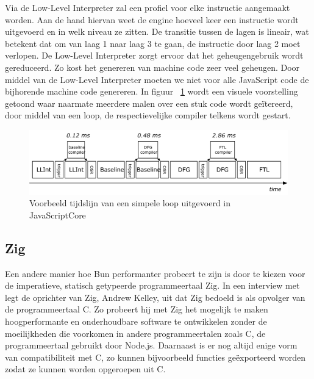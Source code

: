Via de Low-Level Interpreter zal een profiel voor elke instructie aangemaakt worden. 
Aan de hand hiervan weet de engine hoeveel keer een instructie wordt uitgevoerd en in welk niveau ze zitten.
De transitie tussen de lagen is lineair, wat betekent dat om van laag 1 naar laag 3 te gaan, de instructie door laag 2 moet verlopen.
De Low-Level Interpreter zorgt ervoor dat het geheugengebruik wordt gereduceerd. Zo kost het genereren van machine code zeer veel geheugen.
Door middel van de Low-Level Interpreter moeten we niet voor alle JavaScript code de bijhorende machine code genereren.
In figuur ~\ref{fig:JavaScriptcore} wordt een visuele voorstelling getoond 
waar naarmate meerdere malen over een stuk code wordt geïtereerd, door middel van een loop, de respectievelijke compiler telkens wordt gestart.
\begin{figure}[H]
    \centering
    \includegraphics[width=.9\textwidth]{graphics/javascriptcore.png}
    \caption[JavaScriptCore loop]{\label{fig:JavaScriptcore}Voorbeeld tijdslijn van een simpele loop uitgevoerd in JavaScriptCore ~\autocite{Pizlo2020}}
\end{figure}

\subsection{Zig}
Een andere manier hoe Bun performanter probeert te zijn is door te kiezen voor de imperatieve, statisch getypeerde programmeertaal Zig. 
In een interview met ~\textcite{Motroc2017} legt de oprichter van Zig, Andrew Kelley, uit dat Zig bedoeld is als opvolger van de programmeertaal C.
Zo probeert hij met Zig het mogelijk te maken hoogperformante en onderhoudbare software te ontwikkelen 
zonder de moeilijkheden die voorkomen in andere programmeertalen zoals C, de programmeertaal gebruikt door Node.js.
Daarnaast is er nog altijd enige vorm van compatibiliteit met C, 
zo kunnen bijvoorbeeld functies geëxporteerd  worden zodat ze kunnen worden opgeroepen uit C.

